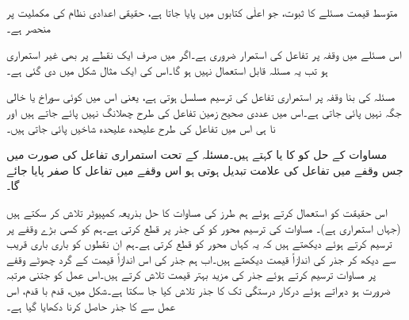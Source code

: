 متوسط قیمت مسئلے کا ثبوت، جو اعلٰی  کتابوں میں پایا جاتا ہے، حقیقی اعدادی نظام کی مکملیت پر منحصر ہے۔

اس مسئلے میں وقفہ  پر تفاعل  کی استمرار ضروری ہے۔اگر  میں صرف ایک نقطے پر بھی  غیر استمراری ہو تب یہ مسئلہ قابل استعمال نہیں ہو گا۔اس کی ایک مثال شکل  میں دی گئی ہے۔


مسئلہ  کی بنا وقفہ  پر استمراری تفاعل کی ترسیم مسلسل ہوتی ہے، یعنی اس میں کوئی سوراخ یا خالی جگہ نہیں پائی جاتی ہے۔اس میں عددی صحیح زمین تفاعل  کی طرح چھلانگ  نہیں پائے جاتے ہیں اور نا ہی اس میں تفاعل  کی طرح علیحدہ علیحدہ شاخیں پائی جاتی ہیں۔

مساوات  کے حل کو  کا  یا  کہتے ہیں۔مسئلہ  کے تحت استمراری تفاعل کی صورت میں جس وقفے میں تفاعل کی علامت  تبدیل ہوتی ہو اس وقفے میں تفاعل کا صفر پایا جائے گا۔

اس حقیقت کو استعمال کرتے ہوئے ہم   طرز کی مساوات کا حل بذریعہ کمپیوٹر تلاش کر سکتے ہیں  (جہاں  استمراری ہے)۔ مساوات کی ترسیم  محور کو  کی جذر پر قطع کرتی ہے۔ہم  کو کسی بڑے وقفے پر ترسیم کرتے ہوئے دیکھتے ہیں کہ یہ کہاں  محور کو قطع کرتی ہے۔ہم ان نقطوں  کو باری باری قریب سے دیکھ کر جذر کی اندازاً قیمت دیکھتے ہیں۔اب ہم جذر کی اس اندازاً  قیمت کے گرد چھوٹے وقفے پر مساوات ترسیم کرتے ہوئے جذر کی مزید بہتر قیمت تلاش کرتے ہیں۔اس عمل کو جتنی مرتبہ ضرورت ہو دہراتے ہوئے درکار درستگی تک کا جذر تلاش کیا جا سکتا ہے۔شکل  میں، قدم با قدم، اس عمل سے   کا  جذر حاصل کرنا دکھایا گیا ہے۔


